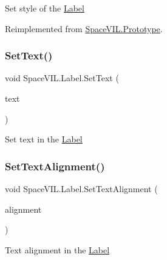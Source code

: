Set style of the \mbox{\hyperlink{class_space_v_i_l_1_1_label}{Label}} 



Reimplemented from \mbox{\hyperlink{class_space_v_i_l_1_1_prototype_ae96644a6ace490afb376fb542161e541}{Space\+V\+I\+L.\+Prototype}}.

\mbox{\label{class_space_v_i_l_1_1_label_a7f6a0dc0e3f9b9a00140f099ff81f8db}} 
\subsubsection{\texorpdfstring{Set\+Text()}{SetText()}}
{\footnotesize\ttfamily void Space\+V\+I\+L.\+Label.\+Set\+Text (\begin{DoxyParamCaption}\item[{String}]{text }\end{DoxyParamCaption})}



Set text in the \mbox{\hyperlink{class_space_v_i_l_1_1_label}{Label}} 

\mbox{\label{class_space_v_i_l_1_1_label_a0f5fc3700bd8979d9760bd8ba424db04}} 
\subsubsection{\texorpdfstring{Set\+Text\+Alignment()}{SetTextAlignment()}}
{\footnotesize\ttfamily void Space\+V\+I\+L.\+Label.\+Set\+Text\+Alignment (\begin{DoxyParamCaption}\item[{Item\+Alignment}]{alignment }\end{DoxyParamCaption})}



Text alignment in the \mbox{\hyperlink{class_space_v_i_l_1_1_label}{Label}} 

\mbox{\label{class_space_v_i_l_1_1_label_ada348a70497547222a0f5d43d0e8b401}} 
